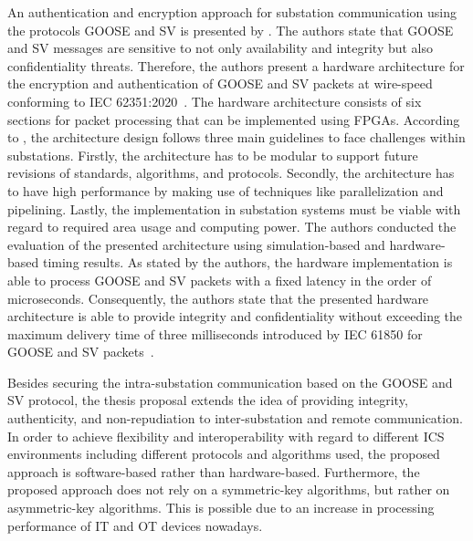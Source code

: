 An authentication and encryption approach for substation communication using the protocols GOOSE and SV is presented by \citeauthor{Rodriguez2021} \cite{Rodriguez2021}.
The authors state that GOOSE and SV messages are sensitive to not only availability and integrity but also confidentiality threats.
Therefore, the authors present a hardware architecture for the encryption and authentication of GOOSE and SV packets at wire-speed conforming to IEC 62351:2020~\cite{IEC62351P6}.
The hardware architecture consists of six sections for packet processing that can be implemented using FPGAs.
According to \citeauthor{Rodriguez2021}, the architecture design follows three main guidelines to face challenges within substations.
Firstly, the architecture has to be modular to support future revisions of standards, algorithms, and protocols.
Secondly, the architecture has to have high performance by making use of techniques like parallelization and pipelining.
Lastly, the implementation in substation systems must be viable with regard to required area usage and computing power.
The authors conducted the evaluation of the presented architecture using simulation-based and hardware-based timing results.
As stated by the authors, the hardware implementation is able to process GOOSE and SV packets with a fixed latency in the order of microseconds.
Consequently, the authors state that the presented hardware architecture is able to provide integrity and confidentiality without exceeding the maximum delivery time of three milliseconds introduced by IEC 61850 for GOOSE and SV packets~\cite{IEC61850P5}.

Besides securing the intra-substation communication based on the GOOSE and SV protocol, the thesis proposal extends the idea of providing integrity, authenticity, and non-repudiation to inter-substation and remote communication.
In order to achieve flexibility and interoperability with regard to different ICS environments including different protocols and algorithms used, the proposed approach is software-based rather than hardware-based.
Furthermore, the proposed approach does not rely on a symmetric-key algorithms, but rather on asymmetric-key algorithms.
This is possible due to an increase in processing performance of IT and OT devices nowadays.

